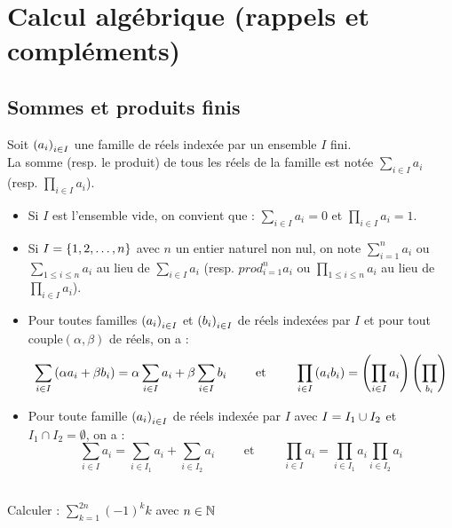 \chapter{Calcul algébrique (rappels et compléments)}

\minitoc
\section{Sommes et produits finis}
\begin{nota}
	Soit \(\left(a_i\right)_{i\in I}\) une famille de réels indexée par un ensemble \(I\) fini. \\
	La somme (resp. le produit) de tous les réels de la famille est notée \(\sum_{i\in I} a_i\) (resp. \(\prod_{i\in I} a_i\)). \\
	\begin{itemize}
		\item Si \(I\) est l'ensemble vide, on convient que : \(\sum_{i\in I} a_i = 0\) et \(\prod_{i\in I} a_i = 1\).
		\item Si \(I = \left\lbrace1,2,\ldots,n\right\rbrace\) avec \(n\) un entier naturel non nul, on note \(\sum_{i=1}^n a_i\)  ou \(\sum_{1\leq i \leq n} a_i\) au lieu de \(\sum_{i\in I} a_i\) (resp. \(prod_{i=1}^n a_i\) ou \(\prod_{1\leq i \leq n} a_i\) au lieu de \(\prod_{i\in I} a_i\)).
	\end{itemize}
\end{nota}
\begin{prop}
	\begin{itemize}
		\item Pour toutes familles \(\left(a_i\right)_{i\in I}\) et \(\left(b_i\right)_{i\in I}\) de réels indexées par \(I\) et pour tout couple\((\alpha,\beta)\) de réels, on a :
		      \[ \sum_{i\in I} \left(\alpha a_i + \beta b_i\right) = \alpha \sum_{i\in I} a_i + \beta \sum_{i\in I} b_i \qquad \text{ et } \qquad \prod_{i\in I} \left(a_i b_i\right) = \left(\prod_{i\in I} a_i\right)\left(\prod_{b_i}\right)\]
		\item Pour toute famille \(\left(a_i\right)_{i\in I}\) de réels indexée par \(I\) avec \(I=I_1 \cup I_2\) et \(I_1\cap I_2 = \emptyset\), on a :
		      \[ \sum_{i\in I} a_i = \sum_{i\in I_1} a_i + \sum_{i\in I_2} a_i \qquad \text{ et } \qquad  \prod_{i\in I} a_i = \prod_{i\in I_1} a_i \prod_{i\in I_2} a_i \]
	\end{itemize}
\end{prop}

\begin{exoex}
	~\\
	Calculer : \(\sum_{k=1}^{2n} (-1)^k k \) avec \(n \in \mathbb{N}\)
\end{exoex}

